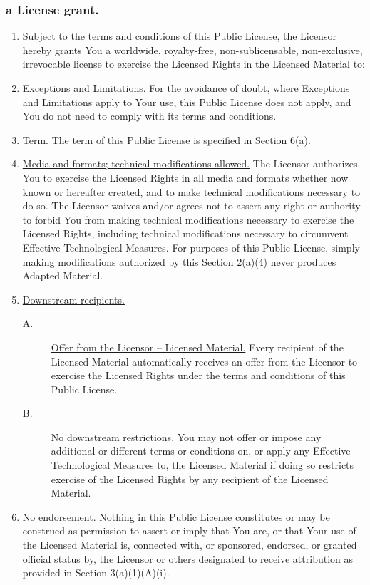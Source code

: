 \documentclass[12pt,a4paper]{article}
\begin{document}
\subsubsection*{a License grant.}
\begin{enumerate}
\setlength{\itemsep}{0cm}
\item        Subject to the terms and conditions of this Public License, the Licensor hereby grants You a worldwide, royalty-free, non-sublicensable, non-exclusive, irrevocable license to exercise the Licensed Rights in the Licensed Material to:
\item \underline{Exceptions and Limitations.} For the avoidance of doubt, where Exceptions and Limitations apply to Your use, this Public License does not apply, and You do not need to comply with its terms and conditions.
\item \underline{Term.} The term of this Public License is specified in Section 6(a).
\item \underline{Media and formats; technical modifications allowed.} The Licensor authorizes You to exercise the Licensed Rights in all media and formats whether now known or hereafter created, and to make technical modifications necessary to do so. The Licensor waives and/or agrees not to assert any right or authority to forbid You from making technical modifications necessary to exercise the Licensed Rights, including technical modifications necessary to circumvent Effective Technological Measures. For purposes of this Public License, simply making modifications authorized by this Section 2(a)(4) never produces Adapted Material.
\item \underline{Downstream recipients.}
\begin{description}
\item[A.] \underline{Offer from the Licensor – Licensed Material.} Every recipient of the Licensed Material automatically receives an offer from the Licensor to exercise the Licensed Rights under the terms and conditions of this Public License.
\item[B.] \underline{No downstream restrictions.} You may not offer or impose any additional or different terms or conditions on, or apply any Effective Technological Measures to, the Licensed Material if doing so restricts exercise of the Licensed Rights by any recipient of the Licensed Material.
\end{description}
\item \underline{No endorsement.} Nothing in this Public License constitutes or may be construed as permission to assert or imply that You are, or that Your use of the Licensed Material is, connected with, or sponsored, endorsed, or granted official status by, the Licensor or others designated to receive attribution as provided in Section 3(a)(1)(A)(i).
\end{enumerate}
      
\end{document}
